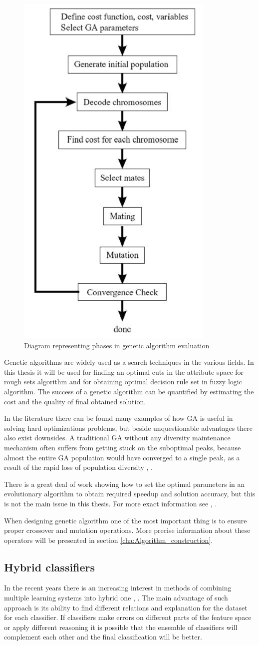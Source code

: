 \begin{figure}[H] 
    \begin{center}
        \includegraphics[height=0.5\textwidth]{fig/genetic.png}
    \end{center}
    \caption{Diagram representing phases in genetic algorithm evaluation}
    \label{fig:genetic_scheme}
\end{figure}

Genetic algorithms are widely used as a search techniques in the various fields. 
In this thesis it will be used for finding an optimal cuts in the attribute
space for rough sets algorithm and for obtaining optimal decision rule set in
fuzzy logic algorithm. The success of a genetic algorithm can be quantified by estimating 
the cost and the quality of final obtained solution. 

In the literature there can be found many examples of how GA is useful in solving hard 
optimizations problems, but beside unquestionable advantages there also exist downsides. 
A traditional GA without any diversity maintenance mechanism often suffers from getting 
stuck on the suboptimal peaks, because almost the entire GA population would have converged 
to a single peak, as a result of the rapid loss of population diversity \cite{bib44}, \cite{bib45}. 

There is a great deal of work showing how to set the optimal parameters in an evolutionary 
algorithm to obtain required speedup and solution accuracy, but this is not the main issue 
in this thesis. For more exact information see \cite{bib42}, \cite{bib43}.

When designing genetic algorithm one of the most important thing is to ensure proper crossover 
and mutation operations. More precise information about these operators will be
presented in section \ref{cha:Algorithm_construction}.

\subsection{Hybrid classifiers} 
\label{cha:Hybrid_classifiers}
In the recent years there is an increasing interest in methods of combining
multiple learning systems into hybrid one \cite{bib5}, \cite{bib6}. The main advantage of such approach
is its ability to find different relations and  explanation for the dataset for each
classifier. If classifiers make errors on different parts of the feature space
or apply different reasoning it is possible that the ensemble of classifiers will complement each other and
the final classification will be better. 

